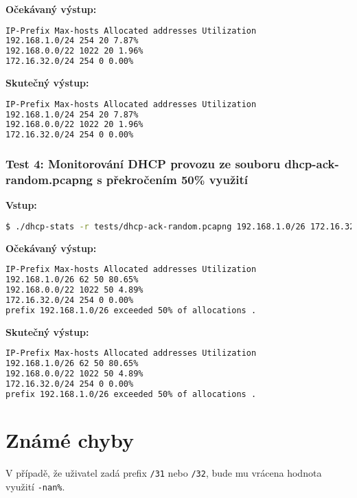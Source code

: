 \documentclass[a4paper, 11pt]{article}
\begin{document}
    \textbf{Očekávaný výstup:}

    \begin{lstlisting}[language=bash]
IP-Prefix Max-hosts Allocated addresses Utilization
192.168.1.0/24 254 20 7.87%
192.168.0.0/22 1022 20 1.96%
172.16.32.0/24 254 0 0.00%
    \end{lstlisting}

    \textbf{Skutečný výstup:}

    \begin{lstlisting}[language=bash]
IP-Prefix Max-hosts Allocated addresses Utilization
192.168.1.0/24 254 20 7.87%
192.168.0.0/22 1022 20 1.96%
172.16.32.0/24 254 0 0.00%
    \end{lstlisting}

    \subsubsection{Test 4: Monitorování DHCP provozu ze souboru dhcp-ack-random.pcapng s překročením 50\% využití}

    \textbf{Vstup:}

    \begin{lstlisting}[language=bash]
$ ./dhcp-stats -r tests/dhcp-ack-random.pcapng 192.168.1.0/26 172.16.32.0/24 192.168.0.0/22
    \end{lstlisting}

    \textbf{Očekávaný výstup:}

    \begin{lstlisting}[language=bash]
IP-Prefix Max-hosts Allocated addresses Utilization
192.168.1.0/26 62 50 80.65%
192.168.0.0/22 1022 50 4.89%
172.16.32.0/24 254 0 0.00%
prefix 192.168.1.0/26 exceeded 50% of allocations .
    \end{lstlisting}

    \textbf{Skutečný výstup:}

    \begin{lstlisting}[language=bash]
IP-Prefix Max-hosts Allocated addresses Utilization
192.168.1.0/26 62 50 80.65%
192.168.0.0/22 1022 50 4.89%
172.16.32.0/24 254 0 0.00%
prefix 192.168.1.0/26 exceeded 50% of allocations .
    \end{lstlisting}

    \section{Známé chyby}

    V případě, že uživatel zadá prefix \texttt{/31} nebo \texttt{/32}, bude mu vrácena hodnota využití \texttt{-nan\%}.
\end{document}
